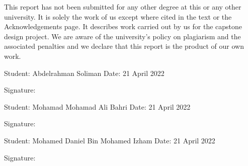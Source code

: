 \documentclass[../main.tex]{subfiles}
\begin{document}
This report has not been submitted for any other degree at this or any
other university. 
It is solely the work of us except where cited in the text or the
Acknowledgements page. 
It describes work carried out by us for the capstone design project. 
We are aware of the university’s policy on plagiarism and the
associated penalties and we declare that this report is the product of
our own work.

\vspace{2\baselineskip}

\noindent
Student: Abdelrahman Soliman \hfill Date: 21 April 2022

\medskip\noindent
Signature:
%

\vspace{2\baselineskip}

\noindent
Student: Mohamad Mohamad Ali Bahri \hfill Date: 21 April 2022

\medskip\noindent
Signature:
%

\vspace{2\baselineskip}

\noindent
Student: Mohamed Daniel Bin Mohamed Izham \hfill Date: 21 April 2022

\medskip\noindent
Signature:
%
\end{document}
